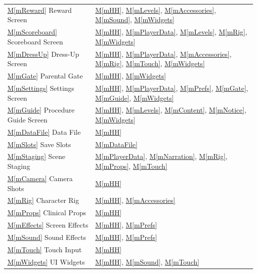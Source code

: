 \documentclass[12pt, titlepage]{article}
\newcommand{\mref}[1]{\hyperref[#1]{M\ref*{#1}}}
\begin{document}
\begin{longtable}{p{} p{}}
\mref{mReward} Reward Screen & \mref{mHH}, \mref{mLevels}, \mref{mAccessories}, \mref{mSound}, \mref{mWidgets}\\
\mref{mScoreboard} Scoreboard Screen & \mref{mHH}, \mref{mPlayerData}, \mref{mLevels}, \mref{mRig}, \mref{mWidgets}\\
\mref{mDressUp} Dress-Up Screen & \mref{mHH}, \mref{mPlayerData}, \mref{mAccessories}, \mref{mRig}, \mref{mTouch}, \mref{mWidgets}\\
\mref{mGate} Parental Gate & \mref{mHH}, \mref{mWidgets}\\
\mref{mSettings} Settings Screen & \mref{mHH}, \mref{mPlayerData}, \mref{mPrefs}, \mref{mGate}, \mref{mGuide}, \mref{mWidgets}\\
\mref{mGuide} Procedure Guide Screen & \mref{mHH}, \mref{mLevels}, \mref{mContent}, \mref{mNotice}, \mref{mWidgets}\\
\mref{mDataFile} Data File & \mref{mHH}\\
\mref{mSlots} Save Slots & \mref{mDataFile}\\
\mref{mStaging} Scene Staging & \mref{mPlayerData}, \mref{mNarration}, \mref{mRig}, \mref{mProps}, \mref{mTouch}\\
\mref{mCamera} Camera Shots & \mref{mHH}\\
\mref{mRig} Character Rig & \mref{mHH}, \mref{mAccessories}\\
\mref{mProps} Clinical Props & \mref{mHH}\\
\mref{mEffects} Screen Effects & \mref{mHH}, \mref{mPrefs}\\
\mref{mSound} Sound Effects & \mref{mHH}, \mref{mPrefs}\\
\mref{mTouch} Touch Input & \mref{mHH}\\
\mref{mWidgets} UI Widgets & \mref{mHH}, \mref{mSound}, \mref{mTouch}\\
\bottomrule
\end{longtable}
\end{document}

